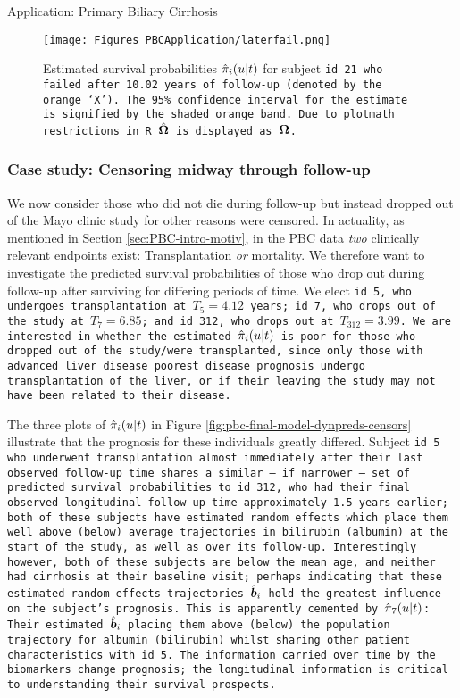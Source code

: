 \begin{chapter}{\label{cha:app-PBC}Application: Primary Biliary Cirrhosis}
  \begin{figure}[ht]
      \centering
      \texttt{[image: Figures\_PBCApplication/laterfail.png]}
      \caption{Estimated survival probabilities $\hat{\pi}_i\!\left( u|t\right)$ for subject \tt{id} 21 who failed after 10.02 years of follow-up (denoted by the orange `X'). The 95\% confidence interval for the estimate is signified by the shaded orange band. Due to \tt{plotmath} restrictions in \tt{R} $\hat{\bm{\Omega}}$ is displayed as $\bm{\mathrm{\Omega}}$.}
      \label{fig:pbc-final-model-dynpreds-laterfail}
  \end{figure}
  
  \subsubsection{Case study: Censoring midway through follow-up}
  We now consider those who did not die during follow-up but instead dropped out of the Mayo clinic study for other reasons \ie were censored. In actuality, as mentioned in Section \ref{sec:PBC-intro-motiv}, in the PBC data \textit{two} clinically relevant endpoints exist: Transplantation \textit{or} mortality. We therefore want to investigate the predicted survival probabilities of those who drop out during follow-up after surviving for differing periods of time. We elect \tt{id} 5, who undergoes transplantation at $T_5=4.12$ years; \tt{id} 7, who drops out of the study at $T_7=6.85$; and \tt{id} 312, who drops out at $T_{312}=3.99$. We are interested in whether the estimated $\hat{\pi}_i\!\left( u|t\right)$ is poor for those who dropped out of the study/were transplanted, since only those with advanced liver disease \ie poorest disease prognosis undergo transplantation of the liver, or if their leaving the study may not have been related to their disease. 

  The three plots of $\hat{\pi}_i\!\left( u|t\right)$ in Figure \ref{fig:pbc-final-model-dynpreds-censors} illustrate that the prognosis for these individuals greatly differed. Subject \tt{id} 5 who underwent transplantation almost immediately after their last observed follow-up time shares a similar -- if narrower -- set of predicted survival probabilities to \tt{id} 312, who had their final observed longitudinal follow-up time approximately 1.5 years earlier; both of these subjects have estimated random effects which place them well above (below) average trajectories in bilirubin (albumin) at the start of the study, as well as over its follow-up. Interestingly however, both of these subjects are below the mean \tt{age}, and neither had cirrhosis at their baseline visit; perhaps indicating that these estimated random effects trajectories $\hat{\bm{b}}_i$ hold the greatest influence on the subject's prognosis. This is apparently cemented by $\hat{\pi}_7\!\left( u|t\right)$: Their estimated $\hat{\bm{b}}_i$ placing them above (below) the population trajectory for albumin (bilirubin) whilst sharing other patient characteristics with \tt{id} 5. The information carried over time by the biomarkers change prognosis; the longitudinal information is critical to understanding their survival prospects.


\end{chapter}
